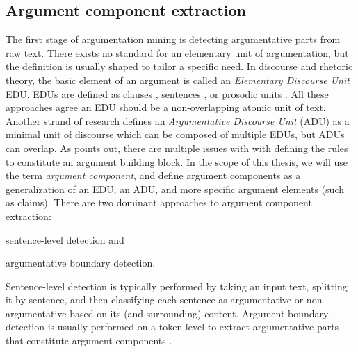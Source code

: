\subsection{Argument component extraction}
\label{subsec:arg_comp_ext}

The first stage of argumentation mining is detecting argumentative parts from
raw text.  There exists no standard for an elementary unit of argumentation,
but the definition is usually shaped to tailor a specific need. In discourse and
rhetoric theory, the basic element of an argument is called an \textit{Elementary
Discourse Unit} EDU. EDUs are defined as clauses \citep{winter1982towards,
givon1983topic}, sentences \citep{polanyi1996linguistic}, or 
prosodic units \citep{sacks1978simplest}. All these approaches agree an EDU
should be a non-overlapping atomic unit of text. Another strand of research defines
an \textit{Argumentative Discourse Unit} (ADU) as a minimal unit of discourse
\citep{peldszus2013argument} which can be composed of multiple EDUs, but ADUs
can overlap. As \citep{lawrence2019argument} points out, there are multiple
issues with with defining the rules to constitute an argument building block.
In the scope of this thesis, we will use the term \emph{argument
component}, and define argument components as a generalization of
an EDU, an ADU, and more specific argument elements (such as claims).
There are two dominant approaches to argument component extraction:
\begin{enumerate*}[label=(\arabic*)]
		\item sentence-level detection and
		\item argumentative boundary detection.
\end{enumerate*}

Sentence-level detection is typically performed by taking an input text, 
splitting it by sentence, and then classifying each sentence as
argumentative or non-argumentative based on its (and surrounding) content. 
Argument boundary detection is usually performed on a token level
to extract argumentative parts that constitute argument components
\citep{lippi2016argumentation}.

